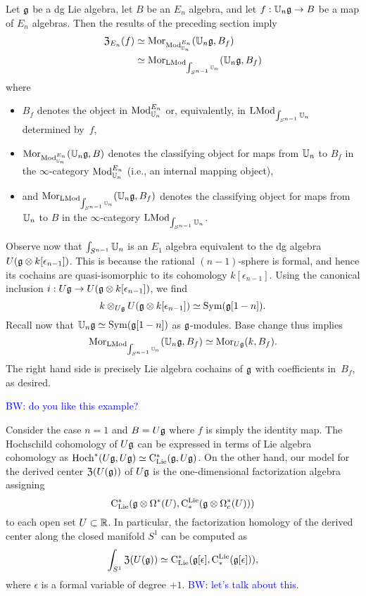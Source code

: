\documentclass[11pt]{amsart}
\numberwithin{equation}{section}
\def\brian{\textcolor{blue}{BW: }\textcolor{blue}}
\begin{document}
Let $\mathfrak g$ be a dg Lie algebra, let $B$ be an $E_n$ algebra, and let $f: \mathbb U_n \mathfrak g \to B$ be a map of $E_n$ algebras.
Then the results of the preceding section imply
\begin{align*}
{\frak Z}_{E_n}(f) &\simeq {{\rm Mor}}_{{\rm Mod}^{E_n}_{\mathbb U_n}}(\mathbb U_n \mathfrak g, B_f) \\
&\simeq {\rm Mor}_{{\rm LMod}_{\int_{S^{n-1}} \mathbb U_n}}(\mathbb U_n \mathfrak g, B_f)
\end{align*}
where 
\begin{itemize}
\item $B_f$ denotes the object in ${\rm Mod}^{E_n}_{\mathbb U_n}$ or, equivalently, in ${\rm LMod}_{\int_{S^{n-1}}\mathbb U_n}$ determined by~$f$,
\item ${\rm Mor}_{{\rm Mod}^{E_n}_{\mathbb U_n}}(\mathbb U_n \mathfrak g, B)$ denotes the classifying object for maps from $\mathbb U_n$ to $B_f$ in the $\infty$-category ${\rm Mod}^{E_n}_{\mathbb U_n}$ (i.e., an internal mapping object),
\item and ${\rm Mor}_{{\rm LMod}_{\int_{S^{n-1}} \mathbb U_n}} (\mathbb U_n \mathfrak g, B_f)$ denotes the classifying object for maps from ${\mathbb U_n}$ to $B$ in the $\infty$-category ${\rm LMod}_{\int_{S^{n-1}}\mathbb U_n}$.
\end{itemize}
Observe now that $\int_{S^{n-1}}\mathbb U_n$ is an $E_1$ algebra equivalent to the dg algebra $U(\mathfrak g \otimes k[\epsilon_{n-1}])$.
This is because the rational $(n-1)$-sphere is formal, and hence its cochains are quasi-isomorphic to its cohomology $k[\epsilon_{n-1}]$.
Using the canonical inclusion $i: U\mathfrak g \to U(\mathfrak g \otimes k[\epsilon_{n-1}])$,
we find
\[
k \otimes_{U\mathfrak g} U(\mathfrak g \otimes k[\epsilon_{n-1}]) \simeq {\rm Sym}(\mathfrak g[1-n]).
\]
Recall now that $\mathbb U_n \mathfrak g \simeq {\rm Sym}(\mathfrak g[1-n])$ as $\mathfrak g$-modules.
Base change thus implies
\[
{\rm Mor}_{{\rm LMod}_{\int_{S^{n-1}} \mathbb U_n}} (\mathbb U_n \mathfrak g, B_f)  \simeq {\rm Mor}_{U\mathfrak g} (k, B_f).
\]
The right hand side is precisely Lie algebra cochains of $\mathfrak g$ with coefficients in~$B_f$, as desired.

\brian{do you like this example?}
\begin{eg}\label{eg: TT}
Consider the case $n=1$ and $B = U \mathfrak g$ where $f$ is simply the identity map. 
The Hochschild cohomology of $U \mathfrak g$ can be expressed in terms of Lie algebra cohomology as ${\rm Hoch}^*(U\mathfrak g,U\mathfrak g) \simeq {\rm C}_{\rm Lie}^*(\mathfrak g, U\mathfrak g)$. 
On the other hand, our model for the derived center ${\frak Z}(U(\mathfrak g))$ of $U \mathfrak g$ is the one-dimensional factorization algebra assigning 
\[
{\rm C}_{\rm Lie}^*(\mathfrak g \otimes \Omega^*(U), {\rm C}^{\rm Lie}_*( \mathfrak g \otimes \Omega^*_c(U)))
\]
to each open set $U \subset \mathbb R$.
In particular, the factorization homology of the derived center along the closed manifold $S^1$ can be computed as
\[
\int_{S^1} {\frak Z}(U(\mathfrak g)) \simeq {\rm C}_{\rm Lie}^*(\mathfrak g[\epsilon], {\rm C}^{\rm Lie}_*( \mathfrak g[\epsilon])),
\]
where $\epsilon$ is a formal variable of degree $+1$. 
\brian{let's talk about this.}
\end{eg}
\end{document}
